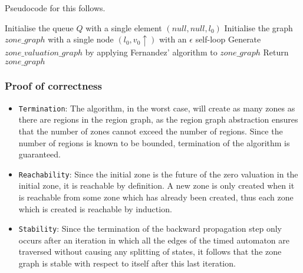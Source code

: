 \documentclass[a4paper]{llncs}
\begin{document}
Pseudocode for this follows.

\begin{algorithm2e}[H]
  Initialise the queue $Q$ with a single element $(null, null, l_0)$\;
  Initialise the graph $zone\_graph$ with a single node $(l_0, v_0 \uparrow)$
  with an $\epsilon$ self-loop\;
  Generate $zone\_valuation\_graph$ by applying Fernandez' algorithm to $zone\_graph$\;
  Return $zone\_graph$\;
\end{algorithm2e}

\subsubsection{Proof of correctness}

\begin{itemize}

\item \texttt{Termination}: The algorithm, in the worst case,
  will create as many zones as there are regions in the region graph,
  as the region graph abstraction ensures that the number of zones
  cannot exceed the number of regions. Since the number of regions is
  known to be bounded, termination of the algorithm is
  guaranteed.

\item \texttt{Reachability}: Since the initial zone is the future of
  the zero valuation in the initial zone, it is reachable by
  definition. A new zone is only created when it is reachable from some
  zone which has already been created, thus each zone which is created
  is reachable by induction.

\item \texttt{Stability}: Since the termination of the backward
  propagation step only occurs after an iteration in which all the
  edges of the timed automaton are traversed without causing any
  splitting of states, it follows that the zone graph is stable with
  respect to itself after this last iteration.

\end{itemize}
\end{document}
